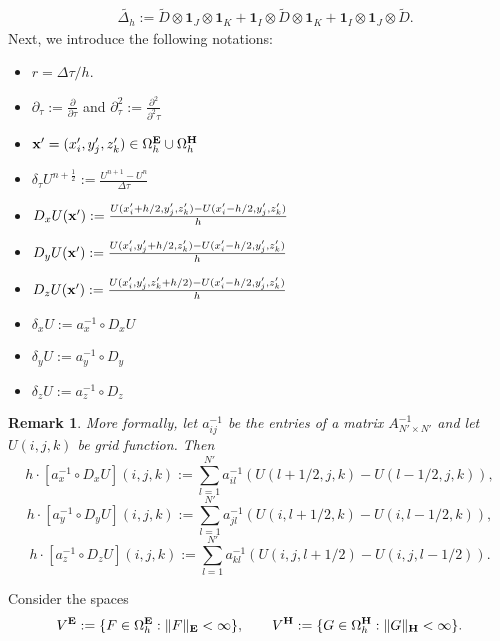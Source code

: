 \documentclass[12pt,reqno]{amsart}
\newcommand{\e}{{\bf E}}
\newcommand{\h}{{\bf H}}
\newtheorem{remark}[theorem]{Remark}
\theoremstyle{definition}
\numberwithin{equation}{section}
\def\Gwh{\Omega_h}
\begin{document}
\begin{align}\label{eq:ext2}
	&
	\tilde{\Delta_h}:=
\tilde{D}\otimes \mathbf{1}_J\otimes \mathbf{1}_K
+ \mathbf{1}_I\otimes \tilde{D}\otimes \mathbf{1}_K  
+ \mathbf{1}_I\otimes \mathbf{1}_J\otimes \tilde{D}. 
\end{align}
   Next, we introduce the following notations:
	\begin{itemize}
		\item $r=\Delta \tau/h$.\\[1mm]
		\item  $\partial_{\tau}:=\frac{\partial}{\partial \tau}$ and $\partial_{\tau}^2:=\frac{\partial^2}{\partial^2 \tau}$\\[1mm]
		\item ${\bf x'}=(x_i',y_j',z_k')\in \Gwh^\e\cup\Gwh^\h$\\[1mm]
		\item $\delta_{\tau} U^{n+\frac{1}{2}}:=\frac{U^{n+1}-U^{n}}{\Delta \tau}$\\[1mm]
				\item $D_x U({\bf x'}):=\frac{U(x_i'+h/2,y_j',z_k')-U(x_i'-h/2,y_j',z_k')}{h}$\\[1mm]
	\item $D_y U({\bf x'}):=\frac{U(x_i',y_j'+h/2,z_k')-U(x_i'-h/2,y_j',z_k')}{h}$\\[1mm]
		\item $D_z U({\bf x'}):=\frac{U(x_i',y_j',z_k'+h/2)-U(x_i'-h/2,y_j',z_k')}{h}$\\[1mm]
		\item $\delta_x U:=a_x^{-1}\circ D_xU$\\[1mm]
		\item $\delta_y U:=a_y^{-1}\circ D_y$\\[1mm]
		\item 	$\delta_z U:=a_z^{-1}\circ D_z$\\[1mm]
	\end{itemize} 
\begin{remark}
More formally, let $a_{ij}^{-1}$ be the entries of a matrix $A_{N'\times N'}^{-1}$ and let $U(i,j,k)$ be grid function.
Then 
$$h\cdot [a_x^{-1}\circ D_xU](i,j,k):=\sum_{l=1}^{N'} a_{il}^{-1}(U(l+1/2,j,k)-U(l-1/2,j,k)),$$
$$h\cdot [a_y^{-1}\circ D_yU](i,j,k):=\sum_{l=1}^{N'} a_{jl}^{-1}(U(i,l+1/2,k)-U(i,l-1/2,k)),$$
$$h\cdot [a_z^{-1}\circ D_zU](i,j,k):=\sum_{l=1}^{N'} a_{kl}^{-1}(U(i,j,l+1/2)-U(i,j,l-1/2)).$$
\end{remark}
		Consider  the spaces 
		$$
		V^{\bf{E}}:=\{F \in \Gwh^{\bf{E}}:\|F\|_{\bf{E}}<\infty\}, \qquad 
		V^{\bf{H}}:=\{G \in \Gwh^{\bf{H}}:\|G\|_{\bf{H}}<\infty\}.
		$$
\end{document}
